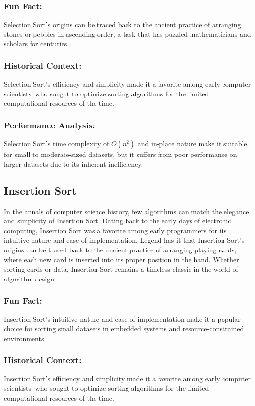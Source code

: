 \documentclass{article}
\begin{document}
\subsubsection{Fun Fact:}
Selection Sort's origins can be traced back to the ancient practice of arranging stones or pebbles in ascending order, a task that has puzzled mathematicians and scholars for centuries.

\subsubsection{Historical Context:}
Selection Sort's efficiency and simplicity made it a favorite among early computer scientists, who sought to optimize sorting algorithms for the limited computational resources of the time.

\subsubsection{Performance Analysis:}
Selection Sort's time complexity of \(O(n^2)\) and in-place nature make it suitable for small to moderate-sized datasets, but it suffers from poor performance on larger datasets due to its inherent inefficiency.

\subsection{Insertion Sort}
In the annals of computer science history, few algorithms can match the elegance and simplicity of Insertion Sort. Dating back to the early days of electronic computing, Insertion Sort was a favorite among early programmers for its intuitive nature and ease of implementation. Legend has it that Insertion Sort's origins can be traced back to the ancient practice of arranging playing cards, where each new card is inserted into its proper position in the hand. Whether sorting cards or data, Insertion Sort remains a timeless classic in the world of algorithm design.

\subsubsection{Fun Fact:}
Insertion Sort's intuitive nature and ease of implementation make it a popular choice for sorting small datasets in embedded systems and resource-constrained environments.

\subsubsection{Historical Context:}
Insertion Sort's efficiency and simplicity made it a favorite among early computer scientists, who sought to optimize sorting algorithms for the limited computational resources of the time.
\end{document}
